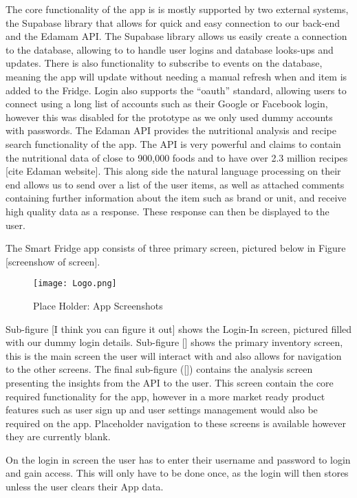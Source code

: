 The core functionality of the app is is mostly supported by two external systems, the Supabase library that allows for quick and easy connection to our back-end and the Edamam API.
The Supabase library allows us easily create a connection to the database, allowing to to handle user logins and database looks-ups and updates.
There is also functionality to subscribe to events on the database, meaning the app will update without needing a manual refresh when and item is added to the Fridge.
Login also supports the “oauth” standard, allowing users to connect using a long list of accounts such as their Google or Facebook login, however this was disabled for the prototype as we only used dummy accounts with passwords.
The Edaman API provides the nutritional analysis and recipe search functionality of the app.
The API is very powerful and claims to contain the nutritional data of close to 900,000 foods and to have over 2.3 million recipes [cite Edaman website].
This along side the natural language processing on their end allows us to send over a list of the user items, as well as attached comments containing further information about the item such as brand or unit, and receive high quality data as a response.
These response can then be displayed to the user.

The Smart Fridge app consists of three primary screen, pictured below in Figure [screenshow of screen].

\begin{figure}[H]        
    \centering
    \texttt{[image: Logo.png]}
    \caption{Place Holder: App Screenshots}
    \label{fig:placeholder}
\end{figure} 

Sub-figure [I think you can figure it out] shows the Login-In screen, pictured filled with our dummy login details.
Sub-figure [] shows the primary inventory screen, this is the main screen the user will interact with and also allows for navigation to the other screens.
The final sub-figure ([]) contains the analysis screen presenting the insights from the API to the user.
This screen contain the core required functionality for the app, however in a more market ready product features such as user sign up and user settings management would also be required on the app.
Placeholder navigation to these screens is available however they are currently blank.

On the login in screen the user has to enter their username and password to login and gain access.
This will only have to be done once, as the login will then stores unless the user clears their App data.

